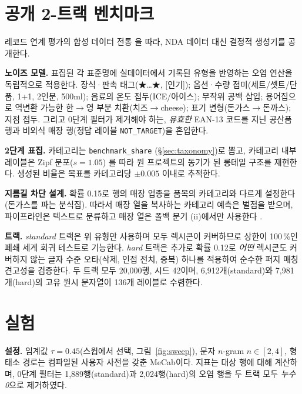 \documentclass[10pt,twocolumn]{article}
\begin{document}
\section{공개 2-트랙 벤치마크}
\label{sec:benchmark}

레코드 연계 평가의 합성 데이터 전통 \cite{christen2005}을 따라, NDA
데이터 대신 결정적 생성기를 공개한다.

\textbf{노이즈 모델.} 표집된 각 표준명에 실데이터에서 기록된 유형을
반영하는 오염 연산을 독립적으로 적용한다. 장식·판촉
태그(\mbox{★}{\dots}\mbox{★}, [인기]); 옵션·수량
접미(세트/셋트/단품, \mbox{1+1}, \mbox{2인분}, \mbox{500ml}); 음료의
온도 접두(ICE/아이스); 무작위 공백 삽입; 용어집으로 역변환 가능한
한$\rightarrow$영 부분 치환(치즈$\rightarrow$cheese); 표기
변형(돈가스$\rightarrow$돈까스); 지점 접두. 그리고 0단계 필터가 제거해야
하는, \emph{유효한} EAN-13 코드를 지닌 공산품 행과 비외식 매장 행(정답
레이블 \texttt{NOT\_TARGET})을 혼입한다.

\textbf{2단계 표집.} 카테고리는 \texttt{benchmark\_share}
(\S\ref{sec:taxonomy})로 뽑고, 카테고리 내부 레이블은 Zipf
분포($s{=}1.05$) \cite{zipf1949}를 따라 원 프로젝트의 동기가 된 롱테일
구조를 재현한다. 생성된 비율은 목표를 카테고리당 $\pm 0.005$ 이내로
추적한다.

\textbf{지름길 차단 설계.} 확률 0.15로 행의 매장 업종을 품목의
카테고리와 다르게 설정한다(돈가스를 파는 분식집). 따라서 매장 열을
복사하는 카테고리 예측은 벌점을 받으며, 파이프라인은 텍스트로 분류하고
매장 열은 폴백 분기 (ii)에서만 사용한다 \cite{geirhos2020}.

\textbf{트랙.} \emph{standard} 트랙은 위 유형만 사용하며 모두 렉시콘이
커버하므로 상한이 100\,\%인 폐쇄 세계 회귀 테스트로 기능한다.
\emph{hard} 트랙은 추가로 확률 0.12로 \emph{어떤} 렉시콘도 커버하지 않는
글자 수준 오타(삭제, 인접 전치, 중복) 하나를 적용하여 순수한 퍼지 매칭
견고성을 검증한다. 두 트랙 모두 20{,}000행, 시드 42이며,
6{,}912개(standard)와 7{,}981개(hard)의 고유 원시 문자열이 136개
레이블로 수렴한다.

\section{실험}
\label{sec:results}

\textbf{설정.} 임계값 $\tau{=}0.45$(스윕에서 선택, 그림~\ref{fig:sweep}),
문자 $n$-gram $n\in[2,4]$, 형태소 경로는 컴파일된 사용자 사전을 갖춘
MeCab이다. 지표는 대상 행에 대해 계산하며, 0단계 필터는
1{,}889행(standard)과 2{,}024행(hard)의 오염 행을 두 트랙 모두
\emph{누수 0}으로 제거하였다.
\end{document}
